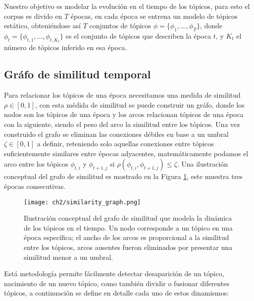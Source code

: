 \documentclass[letterpaper,12pt,oneside]{book} %
\begin{document}

Nuestro objetivo es modelar la evolución en el tiempo de los tópicos, para esto el corpus es divido en $T$ épocas, en cada época se entrena un modelo de tópicos estático, obteniéndose así $T$ conjuntos de tópicos $\phi=\{\phi_{1}, \ldots, \phi_{T}\}$, donde $\phi_{t}=\{\phi_{t,1}, \ldots, \phi_{t,K_{t}}\}$ es el conjunto de tópicos que describen la época $t$, y $K_{t}$ el número de tópicos inferido en esa época.

\subsection{Gráfo de similitud temporal}

Para relacionar los tópicos de una época necesitamos una medida de similitud $\rho \in [0,1]$, con esta médida de similitud se puede construir un gráfo, donde los nodos son los tópicos de una época y los arcos relacionan tópicos de una época con la siguiente, siendo el peso del arco la similitud entre los tópicos. Una vez construido el grafo se eliminan las conexiones débiles en base a un umbral $\zeta \in [0,1]$ a definir, reteniendo solo aquellas conexiones entre tópicos suficientemente similares entre épocas adyacentes, matemáticamente podamos el arco entre los tópicos $\phi_{t,i}$ y $\phi_{t+1,j}$ si $\rho(\phi_{t,i}, \phi_{t+1,j})\leq \zeta$. Una ilustración conceptual del grafo de similitud es mostrado en la Figura \ref{img:graph}, este muestra tres épocas consecutivas.

\begin{figure}
    \centering
    \texttt{[image: ch2/similarity\_graph.png]}
    \caption{Ilustración conceptual del grafo de similitud que modela la dinámica de los tópicos en el tiempo. Un nodo corresponde a un tópico en una época específica; el ancho de los arcos es proporcional a la similitud entre los tópicos, arcos ausentes fueron eliminados por presentar una similitud menor a un umbral.}
    \label{img:graph}
\end{figure}

Está metodología permite fácilmente detectar desaparición de un tópico, nacimiento de un nuevo tópico, como también dividir o fusionar diferentes tópicos, a continuación se define en detalle cada uno de estos dinamismos:
\end{document}
